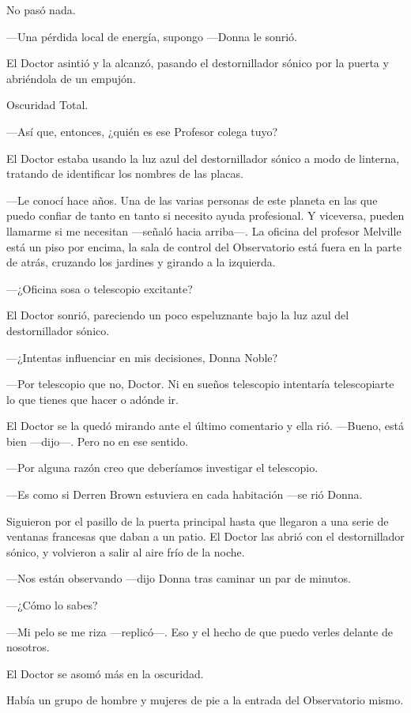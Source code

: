 No pasó nada.

---Una pérdida local de energía, supongo ---Donna le sonrió.

El Doctor asintió y la alcanzó, pasando el destornillador sónico
por la puerta y abriéndola de un empujón.

Oscuridad Total.

---Así que, entonces, ¿quién es ese Profesor colega tuyo?

El Doctor estaba usando la luz azul del destornillador sónico a
modo de linterna, tratando de identificar los nombres de las placas.

---Le conocí hace años. Una de las varias personas de este planeta en
las que puedo confiar de tanto en tanto si necesito ayuda profesional. Y
viceversa, pueden llamarme si me necesitan ---señaló hacia arriba---. La
oficina del profesor Melville está un piso por encima, la sala de
control del Observatorio está fuera en la parte de atrás, cruzando los
jardines y girando a la izquierda.

---¿Oficina sosa o telescopio excitante?

El Doctor sonrió, pareciendo un poco espeluznante bajo la luz azul del
destornillador sónico.

---¿Intentas influenciar en mis decisiones, Donna Noble?

---Por telescopio que no, Doctor. Ni en sueños telescopio intentaría
telescopiarte lo que tienes que hacer o adónde ir.

El Doctor se la quedó mirando ante el último comentario y ella rió.
---Bueno, está bien ---dijo---. Pero no en ese sentido.

---Por alguna razón creo que deberíamos investigar el telescopio.

---Es como si Derren Brown estuviera en cada habitación ---se rió Donna.

Siguieron por el pasillo de la puerta principal hasta que
llegaron a una serie de ventanas francesas que daban a un patio. El
Doctor las abrió con el destornillador sónico, y volvieron a salir al
aire frío de la noche.

---Nos están observando ---dijo Donna tras caminar un par de
minutos.

---¿Cómo lo sabes?

---Mi pelo se me riza ---replicó---. Eso y el hecho de que puedo
verles delante de nosotros.

El Doctor se asomó más en la oscuridad.

Había un grupo de hombre y mujeres de pie a la entrada del
Observatorio mismo.

